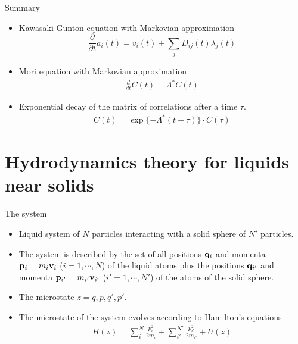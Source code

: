\documentclass{beamer}
\newcommand{\esc}{\!\cdot\!}
\begin{document}
\begin{frame}{Summary}
\begin{itemize}
\item Kawasaki-Gunton equation with Markovian approximation
\begin{equation}
\frac{\partial}{\partial t}a_i(t) = v_i(t) + \sum_j D_{ij}(t) \lambda_j(t)
\nonumber
\end{equation}
\item Mori equation with Markovian approximation
\begin{align}
\frac{d}{dt}C(t)=\Lambda^*C(t)
\nonumber
\end{align}
\item Exponential decay of the matrix of correlations after a time $\tau$.
\begin{align}
C(t)=\exp\{-\Lambda^* (t-\tau)\}\esc C(\tau)
\nonumber
\end{align}
\end{itemize}
\end{frame}

\section{Hydrodynamics theory for liquids near solids}
\begin{frame}{The system}
  \begin{itemize}
    \item Liquid system of $N$ particles interacting with a solid sphere of $N'$ particles.
    \item The system is described  by the set of all  positions  ${\bf  q}_i$  and  momenta  ${\bf  p}_i=m_i{\bf  v}_i$
($i=1,\cdots,N$) of the liquid atoms plus the positions ${\bf q}_{i'}$
and  momenta ${\bf  p}_{i'}=m_{i'}{\bf v}_{i'}$  ($i'=1,\cdots,N'$) of
the atoms  of the solid  sphere. 
\item The microstate $z={q,p,q',p'}$. 
    \item The microstate of the system evolves according to Hamilton's equations 
\begin{align}
H(z) = \sum^N_i \frac{p_i^2}{2m_i} + \sum^{N'}_{i'} \frac{p_{i'}^2}{2m_{i'}}
+ U(z)
\nonumber
\end{align}
\end{itemize}
\end{frame}
\end{document}
